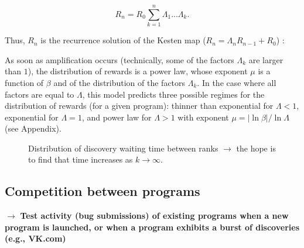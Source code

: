 \begin{equation}
R_{n} = R_{0} \sum_{k=1}^{n} \Lambda_1 ... \Lambda_k.
\end{equation}

Thus, $R_{n}$ is the recurrence solution of the 
Kesten map ($R_{n} = \Lambda_n R_{n-1} +R_0$)
\cite{Kesten,Sorcont}: 

As soon as amplification occurs (technically, 
some of the factors $\Lambda_k$ are larger than $1$), the distribution
of rewards is a power law, whose exponent $\mu$ is a function of $\beta$
and of the distribution of the factors $\Lambda_k$. In the case where
all factors are equal to $\Lambda$, this model predicts three possible regimes for the distribution of rewards (for a given program): thinner than exponential for $\Lambda < 1$, exponential for $\Lambda = 1$, and power law for $\Lambda > 1$ with exponent $\mu = |\ln \beta|/ \ln \Lambda$ (see Appendix).




\begin{figure}
\begin{center}
\caption{Distribution of discovery waiting time between ranks $\rightarrow$ the hope is to find that time increases as $k \rightarrow \infty$.}
\label{fig:decay}
\end{center}
\end{figure}


\subsection{Competition between programs}

$\rightarrow$ {\bf Test activity (bug submissions) of existing programs when a new program is launched, or when a program exhibits a burst of discoveries (e.g., VK.com)}



